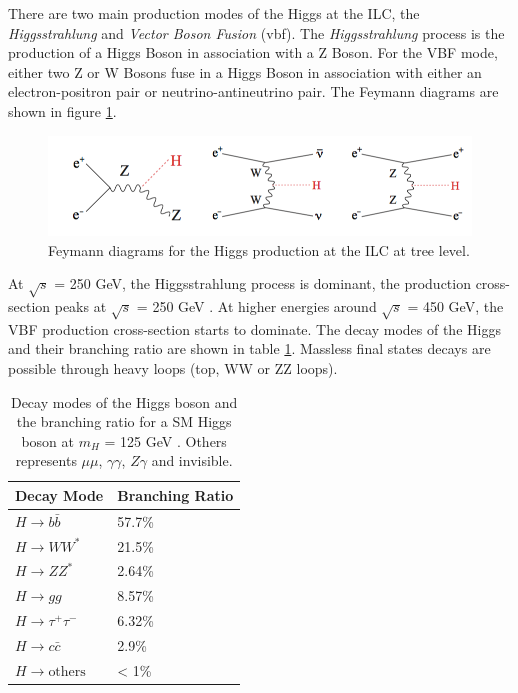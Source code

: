 There are two main production modes of the Higgs at the ILC, the \textit{Higgsstrahlung} and \textit{Vector Boson Fusion} (\acrshort{vbf}). The \textit{Higgsstrahlung} process is the production of a Higgs Boson in association with a Z Boson. For the VBF mode, either two Z or W Bosons fuse in a Higgs Boson in association with either an electron-positron pair or neutrino-antineutrino pair. The Feymann diagrams are shown in figure \ref{fig:HiggsProd}.

\begin{figure}[htbp!]
  \centering
  \includegraphics[width=1\linewidth]{chap2/fig/HiggsProd.png}
  \caption{Feymann diagrams for the Higgs production at the ILC at tree level. \cite{ILC_TDR_Vol2}} \label{fig:HiggsProd}
\end{figure}

At $\sqrt{s}$ = 250 GeV, the Higgsstrahlung process is dominant, the production cross-section peaks at $\sqrt{s}$ = 250 GeV \cite{Moortgat-Picka:2015yla}. At higher energies around $\sqrt{s}$ = 450 GeV, the VBF production cross-section starts to dominate. The decay modes of the Higgs and their branching ratio are shown in table \ref{table:BRHiggs}. Massless final states decays are possible through heavy loops (top, WW or ZZ loops).

\begin{table}
  \centering
  \caption{Decay modes of the Higgs boson and the branching ratio for a SM Higgs boson at $m_H$ = 125 GeV \cite{}. Others represents $\mu\mu$, $\gamma\gamma$, $Z\gamma$ and invisible.}
  \label{table:BRHiggs}
  \begin{tabular}{@{}ll@{}} \toprule
    Decay Mode & Branching Ratio \\ \midrule
    $H \rightarrow b\bar{b}$ & 57.7\% \\
    $H \rightarrow WW^*$ & 21.5\% \\
    $H \rightarrow ZZ^*$ & 2.64\% \\
    $H \rightarrow gg$ & 8.57\% \\
    $H \rightarrow \tau^+\tau^-$ & 6.32\% \\
    $H \rightarrow c\bar{c}$ & 2.9\% \\
    $H \rightarrow \text{others}$ & < 1\% \\
    \bottomrule
  \end{tabular}
\end{table}

